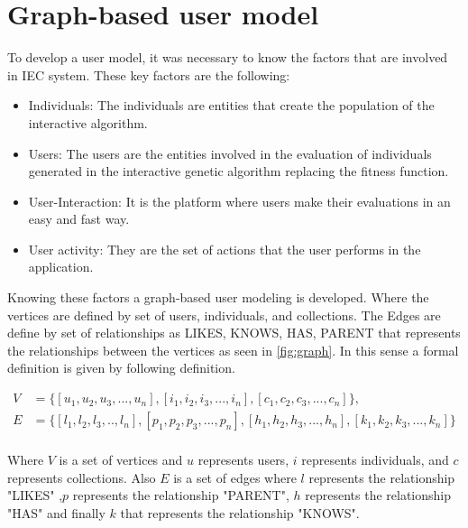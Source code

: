 \section{Graph-based user model} 

To develop a user model, it was necessary to know the factors that are involved in
IEC system. These key factors are the following:

\begin{itemize} 
\item Individuals: The individuals are entities that create the population
of the interactive algorithm.  
\item Users: The users are the entities 
involved in the evaluation of individuals generated in the interactive genetic
algorithm replacing the fitness function.
\item User-Interaction: It is the platform where users make their evaluations in an 
easy and fast way.
\item User activity: They are the set of actions that the user performs in the application. 
\end{itemize}


Knowing these factors a graph-based user modeling is developed. Where the vertices are defined by set of users, individuals, and
collections. The Edges are define by set of relationships as LIKES, KNOWS, HAS, PARENT that represents the relationships between the vertices as seen in \ref{fig:graph}. In this sense a formal definition is given by following definition.


\begin{equation*}\label{eq:graphRelDef} 
\displaystyle 
\begin{split} 
V &= \{[u_1,u_2,u_3,...,u_n],[i_1,i_2,i_3,...,i_n],[c_1,c_2,c_3,...,c_n]\},\\ 
E&= \{[l_1,l_2,l_3,..,l_n],[p_1,p_2,p_3,...,p_n],[h_1,h_2,h_3,...,h_n],[k_1,k_2,k_3,...,k_n]\}\\ 
\end{split} 
\end{equation*} 

Where $V$ is a set of vertices and $u$ represents users, $i$ represents
individuals, and $c$ represents collections. Also $E$ is a set of edges where
$l$ represents the relationship "LIKES" ,$p$ represents the relationship
"PARENT", $h$ represents the relationship "HAS" and finally $k$ that represents
the relationship "KNOWS".

